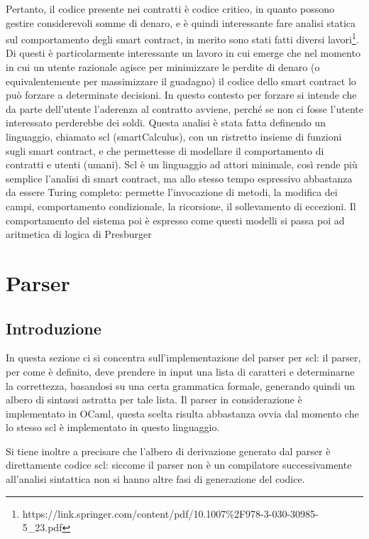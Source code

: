\documentclass[]{article}
\begin{document}
Pertanto, il codice presente nei contratti è codice critico, in quanto
possono gestire considerevoli somme di denaro, e è quindi interessante
fare analisi statica sul comportamento degli smart contract, in merito
sono stati fatti diversi lavori\footnote{https://link.springer.com/content/pdf/10.1007\%2F978-3-030-30985-5\_23.pdf}.
Di questi è particolarmente interessante un lavoro in cui emerge che nel
momento in cui un utente razionale agisce per minimizzare le perdite di
denaro (o equivalentemente per massimizzare il guadagno) il codice dello
smart contract lo può forzare a determinate decisioni. In questo
contesto per forzare si intende che da parte dell'utente l'aderenza al
contratto avviene, perché se non ci fosse l'utente interessato
perderebbe dei soldi. Questa analisi è stata fatta definendo un
linguaggio, chiamato scl (smartCalculus), con un ristretto insieme di
funzioni sugli smart contract, e che permettesse di modellare il
comportamento di contratti e utenti (umani). Scl è un linguaggio ad
attori minimale, così rende più semplice l'analisi di smart contract, ma
allo stesso tempo espressivo abbastanza da essere Turing completo:
permette l'invocazione di metodi, la modifica dei campi, comportamento
condizionale, la ricorsione, il sollevamento di eccezioni. Il
comportamento del sistema poi è espresso come questi modelli si passa
poi ad aritmetica di logica di Presburger

\hypertarget{parser}{%
\section{Parser}\label{parser}}

\hypertarget{introduzione-1}{%
\subsection{Introduzione}\label{introduzione-1}}

In questa sezione ci si concentra sull'implementazione del parser per
scl: il parser, per come è definito, deve prendere in input una lista di
caratteri e determinarne la correttezza, basandosi su una certa
grammatica formale, generando quindi un albero di sintassi astratta per
tale lista. Il parser in considerazione è implementato in OCaml, questa
scelta risulta abbastanza ovvia dal momento che lo stesso scl è
implementato in questo linguaggio.

Si tiene inoltre a precisare che l'albero di derivazione generato dal
parser è direttamente codice scl: siccome il parser non è un compilatore
successivamente all'analisi sintattica non si hanno altre fasi di
generazione del codice.
\end{document}
